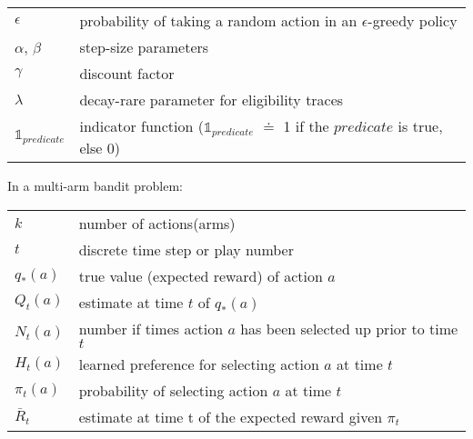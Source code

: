 \documentclass[10pt, landscape, a4paper]{article}
\begin{document}
\begin{multicols}{3}
        \begin{tabular}{ p{} p{} }
            $\epsilon$               & probability of taking a random action in an $\epsilon$-greedy policy                        \\
            $\alpha$, $\beta$        & step-size parameters                                                                        \\
            $\gamma$                 & discount factor                                                                             \\
            $\lambda$                & decay-rare parameter for eligibility traces                                                 \\
            $\mathds{1}_{predicate}$ & indicator function ($\mathds{1}_{predicate}$ $\doteq$ 1 if the $predicate$ is true, else 0) \\
        \end{tabular}


        In a multi-arm bandit problem:
        \begin{tabular}{ p{} p{} }
            $k$          & number of actions(arms)                                           \\
            $t$          & discrete time step or play number                                 \\
            $q_{*}(a)$   & true value (expected reward) of action $a$                        \\
            $Q_{t}(a)$   & estimate at time $t$ of $q_{*}(a)$                                \\
            $N_{t}(a)$   & number if times action $a$ has been selected up prior to time $t$ \\
            $H_{t}(a)$   & learned preference for selecting action $a$ at time $t$           \\
            $\pi_{t}(a)$ & probability of selecting action $a$ at time $t$                   \\
            $\bar{R}_t$  & estimate at time t of the expected reward given $\pi_t$           \\
        \end{tabular}


\end{multicols}
\end{document}
